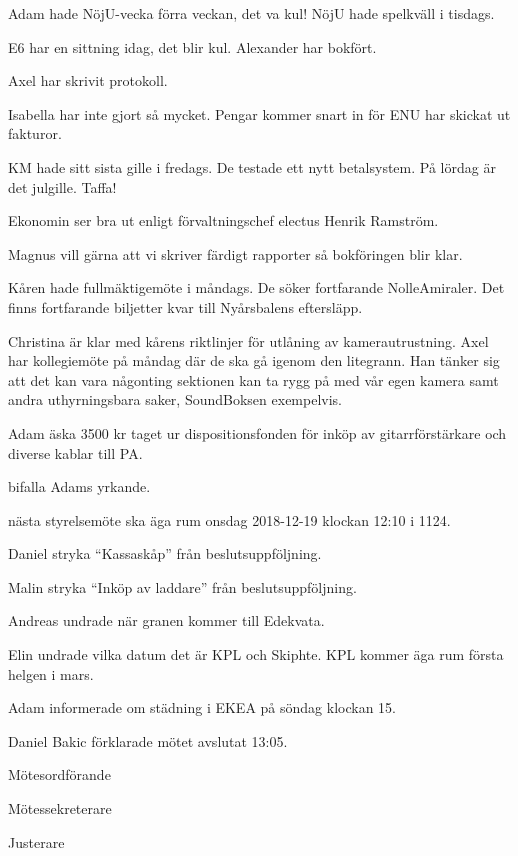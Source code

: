 \documentclass[10pt]{article}
\def\mo{Daniel Bakic}
\def\ms{Axel Voss}
\def\ji{Alexander Wik}
\begin{document}
\begin{paragrafer}
\begin{paragrafer}
		Adam hade NöjU-vecka förra veckan, det va kul! NöjU hade spelkväll i tisdags.

		E6 har en sittning idag, det blir kul. Alexander har bokfört. 

		Axel har skrivit protokoll.

		Isabella har inte gjort så mycket. Pengar kommer snart in för ENU har skickat ut fakturor. 

		KM hade sitt sista gille i fredags. De testade ett nytt betalsystem. På lördag är det julgille. Taffa!


		Ekonomin ser bra ut enligt förvaltningschef electus Henrik Ramström.

		Magnus vill gärna att vi skriver färdigt rapporter så bokföringen blir klar.


		Kåren hade fullmäktigemöte i måndags. De söker fortfarande NolleAmiraler. 
		Det finns fortfarande biljetter kvar till Nyårsbalens eftersläpp. 


		Christina är klar med kårens riktlinjer för utlåning av kamerautrustning.
		Axel har kollegiemöte på måndag där de ska gå igenom den litegrann.
		Han tänker sig att det kan vara någonting sektionen kan ta rygg på med vår egen kamera
		samt andra uthyrningsbara saker, SoundBoksen exempelvis. 

	\end{paragrafer}


	Adam \ypa äska 3500 kr taget ur dispositionsfonden för inköp av gitarrförstärkare och diverse kablar till PA.

	\Mba bifalla Adams yrkande.


	\Mba nästa styrelsemöte ska äga rum onsdag 2018-12-19 klockan 12:10 i 1124.


	Daniel \ypa stryka ``Kassaskåp'' från beslutsuppföljning.

	Malin \ypa stryka ``Inköp av laddare'' från beslutsuppföljning.

	\Mbabay


	Andreas undrade när granen kommer till Edekvata.

	Elin undrade vilka datum det är KPL och Skiphte. KPL kommer äga rum första helgen i mars.   

	Adam informerade om städning i EKEA på söndag klockan 15.

	
	{\mo} förklarade mötet avslutat 13:05.

\end{paragrafer}

\hidesignfoot
\begin{signatures}{3}
	\signature{\mo}{Mötesordförande}
	\signature{\ms}{Mötessekreterare}
	\signature{\ji}{Justerare}
\end{signatures}
\end{document}
